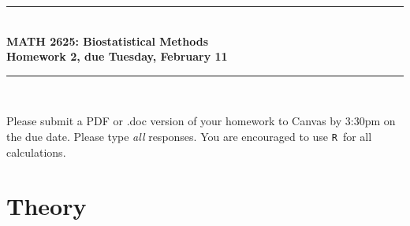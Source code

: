 \documentclass{article}
\newcommand{\HRule}{\rule{\linewidth}{0.5mm}}
\newcommand{\R}{\texttt{R}}
\begin{document}
	\begin{center}
		\HRule \\[0.1cm]
		\vspace{0.1cm}
		{ \LARGE \bfseries MATH 2625: Biostatistical Methods\\[0.5cm] Homework 2, due Tuesday, February 11 } \\[0.1cm]
		\HRule \\[0.1cm]
	\end{center}
	
	Please submit a PDF or .doc version of your homework to Canvas by 3:30pm on the due date. Please type \emph{all} responses. You are encouraged to use \R\ for all calculations.
		
	\section*{Theory}
\end{document}
